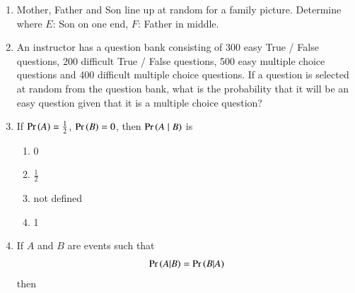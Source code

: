 \begin{enumerate}[label=\thesubsection.\arabic*,ref=\thesubsection.\theenumi]
		\begin{multicols}{3}
\begin{enumerate}
	\item $\pr{AB}$   
	\item $\pr{A \mid B}$
	\item $\pr{B \mid A}$
\end{enumerate}
\end{multicols}
\solution
		
\item Mother, Father and Son line up at random for a family picture. Determine  where 
$E$: Son on one end, $F$: Father in middle.
\\
\solution
		
	\item An instructor has a question bank consisting of 300 easy True / False questions,
200 difficult True / False questions, 500 easy multiple choice questions and 400
difficult multiple choice questions. If a question is selected at random from the
question bank, what is the probability that it will be an easy question given that it
is a multiple choice question?
\\
\solution
		
\item If $ \Pr\left(A\right)  = \frac{1}{2}$, $\Pr\left(B\right) = 0$, then $\pr{A \mid B}$ is
	\begin{multicols}{4}
\begin{enumerate}
\item 0
\item $\frac{1}{2}$
\item not defined
\item 1
\end{enumerate}
\end{multicols}
 \item If $A$ and $B$ are events such that 
    \begin{align}
        \pr{A|B} = \pr{B|A}
        \label{eq:ncert/12/13/1/17/cond}
    \end{align} 
    then 


\end{enumerate}
